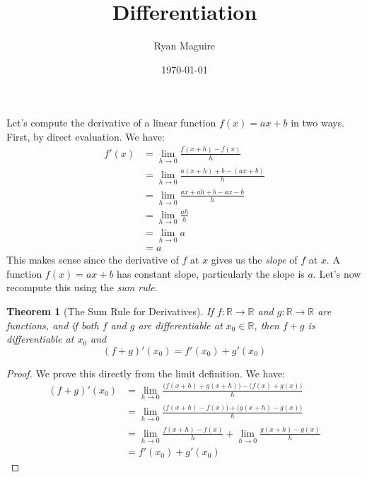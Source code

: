 \documentclass{article}
\title{Differentiation}
\author{Ryan Maguire}
\date{\today}
\theoremstyle{plain}
\newtheorem{theorem}{Theorem}
\begin{document}
    \maketitle
    Let's compute the derivative of a linear function $f(x)=ax+b$ in two ways.
    First, by direct evaluation. We have:
    \begin{align}
        f'(x)
        &=\lim_{h\rightarrow{0}}\frac{f(x+h)-f(x)}{h}\\
        &=\lim_{h\rightarrow{0}}\frac{a(x+h)+b-(ax+b)}{h}\\
        &=\lim_{h\rightarrow{0}}\frac{ax+ah+b-ax-b}{h}\\
        &=\lim_{h\rightarrow{0}}\frac{ah}{h}\\
        &=\lim_{h\rightarrow{0}}a\\
        &=a
    \end{align}
    This makes sense since the derivative of $f$ at $x$ gives us the
    \textit{slope} of $f$ at $x$. A function $f(x)=ax+b$ has constant slope,
    particularly the slope is $a$. Let's now recompute this using the
    \textit{sum rule}.
    \par\hfill\par
    \begin{theorem}[The Sum Rule for Derivatives]
        If $f:\mathbb{R}\rightarrow\mathbb{R}$ and
        $g:\mathbb{R}\rightarrow\mathbb{R}$ are functions, and if both
        $f$ and $g$ are differentiable at $x_{0}\in\mathbb{R}$, then
        $f+g$ is differentiable at $x_{0}$ and
        \begin{equation}
            (f+g)'(x_{0})=f'(x_{0})+g'(x_{0})
        \end{equation}
    \end{theorem}
    \begin{proof}
        We prove this directly from the limit definition. We have:
        \begin{align}
            (f+g)'(x_{0})
                &=\lim_{h\rightarrow{0}}
                    \frac{\big(f(x+h)+g(x+h)\big)-\big(f(x)+g(x)\big)}{h}\\
                &=\lim_{h\rightarrow{0}}
                    \frac{\big(f(x+h)-f(x)\big)+\big(g(x+h)-g(x)\big)}{h}\\
                &=\lim_{h\rightarrow{0}}\frac{f(x+h)-f(x)}{h}+
                    \lim_{h\rightarrow{0}}\frac{g(x+h)-g(x)}{h}\\
                &=f'(x_{0})+g'(x_{0})
        \end{align}
    \end{proof}
\end{document}
